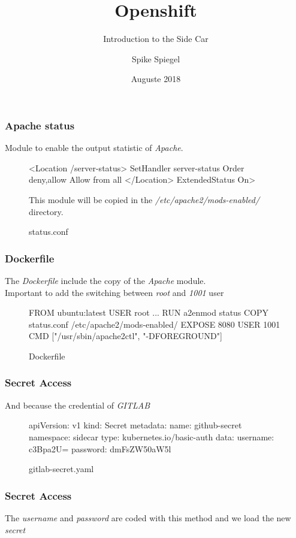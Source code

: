\documentclass{beamer}
\title{Openshift}
\subtitle{Introduction to the Side Car}
\author{Spike Spiegel}
\institute{Cowboy Bebop}
\date{Auguste 2018}
\begin{document}
\frame{\titlepage}




\begin{frame}[fragile]
  \frametitle{Apache status}
  Module to enable the output statistic of \emph{Apache}.
  
  \begin{figure}
    \begin{apachecode}
      <Location /server-status>
      SetHandler server-status
      Order deny,allow
      Allow from all
      </Location> ExtendedStatus On>
    \end{apachecode}
    \caption{status.conf}
    
    This module will be copied in the \emph{/etc/apache2/mods-enabled/} directory.
  \end{figure}
\end{frame}

\begin{frame}[fragile]
  \frametitle{Dockerfile}
  The \emph{Dockerfile} include the copy of the \emph{Apache} module.\\
  Important to add the switching between \textit{root} and \textit{1001} user
  \begin{figure}
    \begin{dockercode}
      FROM ubuntu:latest
      USER root
      ...
      RUN a2enmod status
      COPY status.conf /etc/apache2/mods-enabled/
      EXPOSE 8080
      USER 1001
      CMD ["/usr/sbin/apache2ctl", "-DFOREGROUND"]
    \end{dockercode}
    \caption{Dockerfile}
  \end{figure}
  
\end{frame}

\begin{frame}[fragile]
  \frametitle{Secret Access}
  And because the credential of \emph{GITLAB}
  \begin{figure}
    \begin{yamlcode}
      apiVersion: v1
      kind: Secret
      metadata:
        name: github-secret
        namespace: sidecar
      type: kubernetes.io/basic-auth
      data:
        username: c3Bpa2U=
        password: dmFsZW50aW5l
    \end{yamlcode}
    \caption{gitlab-secret.yaml}
  \end{figure}
\end{frame}

\begin{frame}[fragile]
  \frametitle{Secret Access}
  The \emph{username} and \emph{password} are coded with this method and we load the new \emph{secret}
\end{frame}
\end{document}

